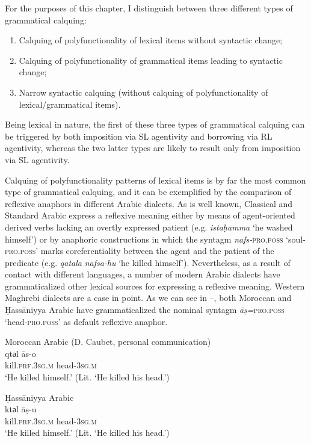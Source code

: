 \documentclass[output=paper]{langsci/langscibook}
\begin{document}
For the purposes of this chapter, I distinguish between three different types of grammatical calquing: 

\begin{enumerate} 
\item Calquing of polyfunctionality of lexical items without syntactic change;
\item Calquing of polyfunctionality of grammatical items leading to syntactic change; 
\item Narrow syntactic calquing (without calquing of polyfunctionality of lexical/grammatical items).
\end{enumerate}

Being lexical in nature, the first of these three types of grammatical calquing can be triggered by both imposition via SL agentivity and borrowing via RL agentivity, whereas the two latter types are likely to result only from imposition via SL agentivity. 

Calquing of polyfunctionality patterns of lexical items is by far the most common type of grammatical calquing, and it can be exemplified by the comparison of reflexive anaphors in different Arabic dialects. As is well known, Classical and Standard Arabic express a reflexive meaning either by means of agent-oriented derived verbs lacking an overtly expressed patient (e.g. \textit{istaḥamma} ‘he washed himself’) or by anaphoric constructions in which the syntagm \textit{nafs-}\textsc{pro.poss} ‘soul-\textsc{pro.poss’} marks coreferentiality between the agent and the patient of the predicate (e.g. \textit{qatala} \textit{nafsa-hu} ‘he killed himself’). Nevertheless, as a result of contact with different languages, a number of modern Arabic dialects have grammaticalized other lexical sources for expressing a reflexive meaning. Western Maghrebi dialects are a case in point. As we can see in --, both Moroccan and Ḥassāniyya Arabic have grammaticalized the nominal syntagm \textit{{\R}āṣ=}\textsc{pro.poss} ‘head-\textsc{pro.poss’} as default reflexive anaphor.

\ea\label{ex:key:15}
{Moroccan Arabic (D. Caubet, personal communication)} \\
\gll   qtәl {\R}ās-o\\
       kill.\textsc{prf.3sg.m} head-\textsc{3sg.m}\\
\glt   `He killed himself.' (Lit. ‘He killed his head.’)
\z

\ea\label{ex:key:16}
{Ḥassāniyya Arabic \citep[16]{Taine-Cheikh2008chapter}}\\
\gll   ktәl {\R}āṣ-u\\
       kill.\textsc{prf.3sg.m} head-\textsc{3sg.m}\\
\glt   `He killed himself.' (Lit. ‘He killed his head.’)
\z
\end{document}

